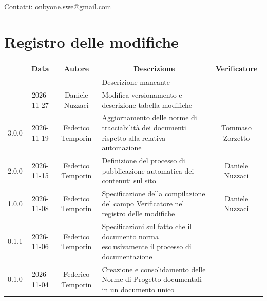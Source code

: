 \documentclass[11pt, a4paper]{article}
\begin{document}
\begin{titlepage}
    \vspace{0.5cm}
    
    {\large Contatti: \href{mailto:onbyone.swe@gmail.com}{onbyone.swe@gmail.com} }
    
\end{titlepage}

\newpage

\section*{Registro delle modifiche}

\vspace{1cm}
\begin{center}
    \renewcommand{\arraystretch}{1.5}
    \begin{tabularx}{\textwidth}{|c|c|c|X|c|}
        \hline
        \rowcolor{gray!10} 
        \multicolumn{1}{|c|}{\textbf{Versione}} & 
        \multicolumn{1}{c|}{\textbf{Data}} & 
        \multicolumn{1}{c|}{\textbf{Autore}} & 
        \multicolumn{1}{c|}{\textbf{Descrizione}} & 
        \multicolumn{1}{c|}{\textbf{Verificatore}} \\
        \hline
        - & - & - & Descrizione mancante & - \\
        \hline
        - & 2026-11-27 & Daniele Nuzzaci & Modifica versionamento e descrizione tabella modifiche & - \\ %
        \hline
        3.0.0 & 2026-11-19 & Federico Temporin & Aggiornamento delle norme di tracciabilità dei documenti rispetto alla relativa automazione & Tommaso Zorzetto \\ %
        \hline
        2.0.0 & 2026-11-15 & Federico Temporin & Definizione del processo di pubblicazione automatica dei contenuti sul sito & Daniele Nuzzaci \\
        \hline
        1.0.0 & 2026-11-08 & Federico Temporin & Specificazione della compilazione del campo Verificatore nel registro delle modifiche & Daniele Nuzzaci \\
        \hline
        0.1.1 & 2026-11-06 & Federico Temporin & Specificazioni sul fatto che il documento norma esclusivamente il processo di documentazione & - \\
        \hline
        0.1.0 & 2026-11-04 & Federico Temporin & Creazione e consolidamento delle Norme di Progetto documentali in un documento unico & - \\
        \hline
    \end{tabularx}
\end{center}
\vfill
\newpage
\end{document}
